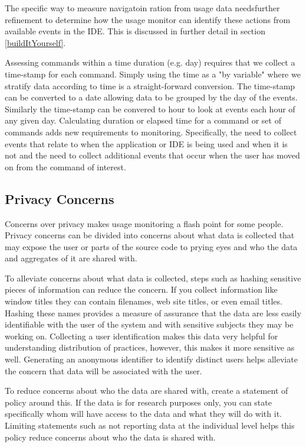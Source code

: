 The specific way to measure navigatoin ration from usage data needsfurther refinement to determine how the usage monitor can identify these actions from available events in the IDE. This is discussed in further detail in section \ref{buildItYourself}.

Assessing commands within a time duration (e.g. day) requires that we collect a time-stamp for each command.  Simply using the time as a "by variable" where we stratify data according to time is a straight-forward conversion.  The time-stamp can be converted to a date allowing data to be grouped by the day of the events.  Similarly the time-stamp can be convered to hour to look at events each hour of any given day.
Calculating duration or elapsed time for a command or set of commands adds new requirements to monitoring.  Specifically, the need to collect events that relate to when the application or IDE is being used and when it is not and the need to collect additional events that occur when the user has moved on from the command of interest.  


\subsection{Privacy Concerns}

Concerns over privacy makes usage monitoring a flash point for some people.  Privacy concerns can be divided into concerns about what data is collected that may expose the user or parts of the source code to prying eyes and who the data and aggregates of it are shared with.

To alleviate concerns about what data is collected, steps such as hashing sensitive pieces of information can reduce the concern. If you collect information like window titles they can contain filenames, web site titles, or even email titles.  Hashing these names provides a measure of assurance that the data are less easily identifiable with the user of the system and with sensitive subjects they may be working on.   Collecting a user identification makes this data very helpful for understanding distribution of practices, however, this makes it more sensitive as well.  Generating an anonymous identifier to identify distinct users helps alleviate the concern that data will be associated with the user.

To reduce concerns about who the data are shared with, create a statement of policy around this.  If the data is for research purposes only, you can state specifically whom will have access to the data and what they will do with it.  Limiting statements such as not reporting data at the individual level helps this policy reduce concerns about who the data is shared with.


